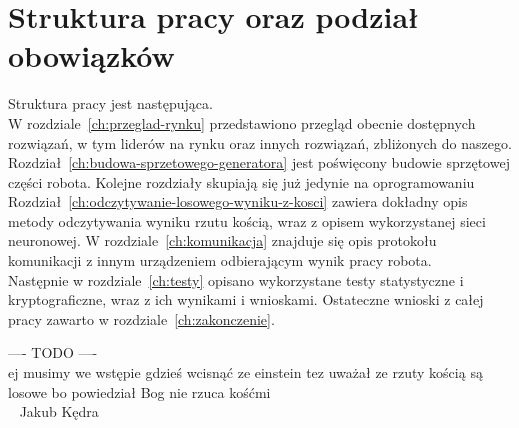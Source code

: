 \section{Struktura pracy oraz podział obowiązków}\label{sec:struktura-pracy-oraz-podzia-obowiazkow}

Struktura pracy jest następująca. \\
W rozdziale~\ref{ch:przeglad-rynku} przedstawiono przegląd obecnie dostępnych rozwiązań,
w tym liderów na rynku oraz innych rozwiązań, zbliżonych do naszego.
Rozdział~\ref{ch:budowa-sprzetowego-generatora} jest poświęcony budowie sprzętowej części robota.
Kolejne rozdziały skupiają się już jedynie na oprogramowaniu
Rozdział~\ref{ch:odczytywanie-losowego-wyniku-z-kosci} zawiera dokładny opis metody odczytywania wyniku rzutu kością,
wraz z opisem wykorzystanej sieci neuronowej.
W rozdziale~\ref{ch:komunikacja} znajduje się opis protokołu komunikacji z innym urządzeniem odbierającym wynik pracy robota. \\
Następnie w rozdziale~\ref{ch:testy} opisano wykorzystane testy statystyczne i kryptograficzne, wraz z ich wynikami i wnioskami.
Ostateczne wnioski z całej pracy zawarto w rozdziale~\ref{ch:zakonczenie}.

---- TODO ---- \\
ej musimy we wstępie gdzieś wcisnąć ze einstein tez uważał ze rzuty kością są losowe bo powiedział Bog nie rzuca kośćmi \\
~ Jakub Kędra

